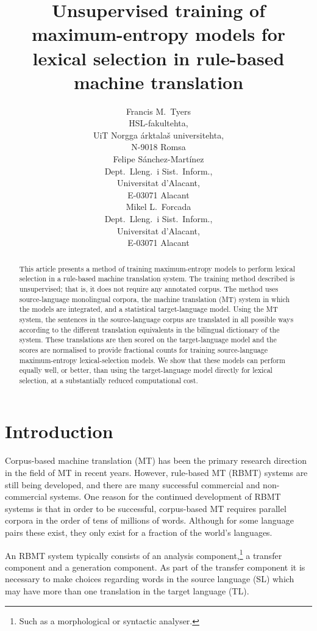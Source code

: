 \documentclass[11pt]{article}
\title{Unsupervised training of maximum-entropy models for lexical
    selection in rule-based machine translation}
\author{
Francis M.\ Tyers \\
HSL-fakultehta, \\
UiT Norgga \'{a}rktala\v{s} universitehta, \\
N-9018 Romsa \\
 \And
Felipe S\'anchez-Mart\'inez \\
Dept.\ Lleng.\ i Sist.\ Inform., \\
Universitat d'Alacant,\\
E-03071 Alacant\\
 \And
Mikel L.\ Forcada \\
Dept.\ Lleng.\ i Sist.\ Inform., \\
Universitat d'Alacant,\\
E-03071 Alacant\\
}
\date{}
\newcommand{\todomlf}[1]{\renewcommand{\baselinestretch}{0.55}\todo{\scriptsize\sf MLF: #1}\renewcommand{\baselinestretch}{1.0}}
\begin{document}
\maketitle

\renewcommand{\baselinestretch}{0.97} %

\begin{abstract}
  This article presents a method of training maximum-entropy models to
  perform lexical selection in a rule-based machine translation
  system. The training method described is unsupervised; that is, it
  does not require any annotated corpus. The method uses
  source-language monolingual corpora, the machine translation (MT)
  system in which the models are integrated, and a statistical
  target-language model. Using the MT system, the sentences in 
  the source-language corpus are
  translated in all possible ways according to the different
  translation equivalents in the bilingual dictionary of the system.
  These translations are then scored on the target-language model and
  the scores are normalised to provide fractional counts for training
  source-language maximum-entropy lexical-selection models. We show
  that these models can perform equally well, or better, than using
  the target-language model directly for lexical selection, at a
  substantially reduced computational cost.
\end{abstract}


\section{Introduction}
Corpus-based machine translation (MT) has been the primary research
direction in the field of MT in recent years. However, rule-based MT
(RBMT) systems are still being developed, and there are many
successful commercial and non-commercial systems. One reason for the
continued development of RBMT systems is that in order to be
successful, corpus-based MT requires parallel corpora in the order of
tens of millions of words. Although for some language pairs these
exist, they only exist for a fraction of the world's languages.

An RBMT system typically consists of an analysis
component,\footnote{Such as a morphological or syntactic analyser.} a
transfer component and a generation component. As part of the transfer
component it is necessary to make choices regarding words in the
source language (SL) which may have more than one translation in the
target language (TL).
\end{document}
